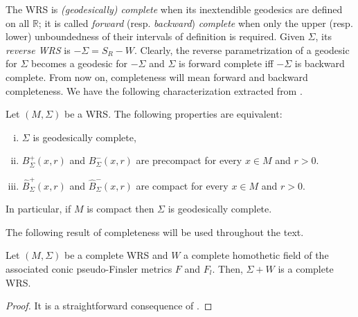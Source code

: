 \documentclass[reqno,10pt]{amsart}
\newcommand{\R}{\mathds R}
\begin{document}
The WRS is {\em  (geodesically) complete} when  its inextendible geodesics are defined on all $\R$; it is called {\em forward} (resp. {\em backward}) {\em complete} when only the upper (resp. lower) unboundedness of their intervals of definition  is required.  
  Given $\Sigma$, its  {\em reverse WRS} is $-\Sigma= S_R-W$. Clearly, the reverse parametrization of  a geodesic for $\Sigma$ becomes a geodesic for $-\Sigma$ and $\Sigma$ is forward complete iff $-\Sigma$ is backward complete. From now on,  completeness will mean forward and backward completeness. We have the following characterization extracted from \cite[Prop. 6.4]{CJSwind}. 
\begin{thm}\label{c63}
Let $(M,\Sigma)$ be a WRS. The following properties are equivalent:
\begin{enumerate}[(i)]
\item $\Sigma$ is geodesically complete, \item $B^+_\Sigma(x,r)$
and $B^-_\Sigma(x,r)$ are precompact for every $x\in M$ and $r>0$.
\item $\hat B^+_\Sigma(x,r)$ and $\hat B^-_\Sigma(x,r)$ are
compact for every $x\in M$ and $r>0$.
\end{enumerate}
In particular, if $M$ is compact then $\Sigma$ is  geodesically  complete.
\end{thm}
The following result of completeness will be used throughout the text.
\begin{thm}\label{JVresult}
Let $(M,\Sigma)$ be a complete WRS and $W$ a complete homothetic field of the associated conic pseudo-Finsler metrics $F$ and $F_l$. Then,  $\Sigma+W$ is a complete WRS.
\end{thm}
\begin{proof}
It is a straightforward consequence of \cite[Theorem 1.2]{JV}.
\end{proof}

\end{document}
